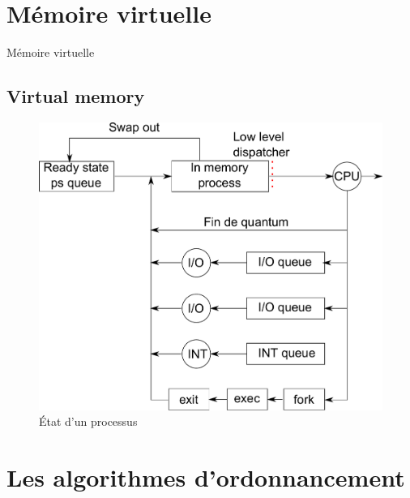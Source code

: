 \def\sectitle{Mémoire virtuelle}
\section{\sectitle}
\begin{frame}{\sectitle}
\def\subsectitle{Virtual memory}
\subsection{\subsectitle}


\begin{figure}
\includegraphics[width=.7\textwidth]{images/virtualmemoryDispatching.pdf}
\caption{État d'un processus}
\end{figure}

\end{frame}





\def\sectitle{Les algorithmes d'ordonnancement}
\section{\sectitle}

